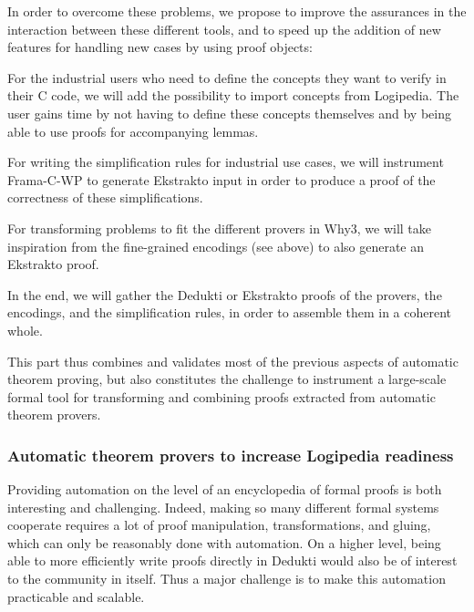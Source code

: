 In order to overcome these problems, we propose to improve the assurances in
the interaction between these different tools, and to speed up the addition of
new features for handling new cases by using proof objects:
\begin{compactitem}
\item For the industrial users who need to define the concepts they want
  to verify in their C code, we will add the possibility to import
  concepts from Logipedia. The user gains time by not having to define
  these concepts themselves and by being able to use proofs for accompanying
  lemmas.

\item For writing the simplification rules for industrial use cases,
  we will instrument Frama-C-WP to generate
  Ekstrakto input in order to produce a proof of the correctness of
  these simplifications.

\item For transforming problems to fit the different provers
  in Why3, we will take inspiration from the fine-grained encodings
  (see above) to also generate an Ekstrakto proof.

\item In the end, we will gather the Dedukti or Ekstrakto proofs of the
  provers, the encodings, and the simplification rules, in order to
  assemble them in a coherent whole.
\end{compactitem}

This part thus combines and validates most of the previous aspects of
automatic theorem proving, but also constitutes the
challenge to instrument a large-scale formal tool for transforming
and combining proofs extracted from automatic theorem provers.

\subsubsection*{Automatic theorem provers to increase Logipedia readiness}

Providing automation on the level of an encyclopedia of formal proofs
is both interesting and challenging. Indeed, making so many different formal
systems cooperate requires a lot of proof manipulation,
transformations, and gluing, which can only be reasonably done with
automation. On a higher level, being able to more efficiently write
proofs directly in Dedukti would also be of interest to the community in
itself. Thus a major challenge is to make this automation practicable and scalable.

